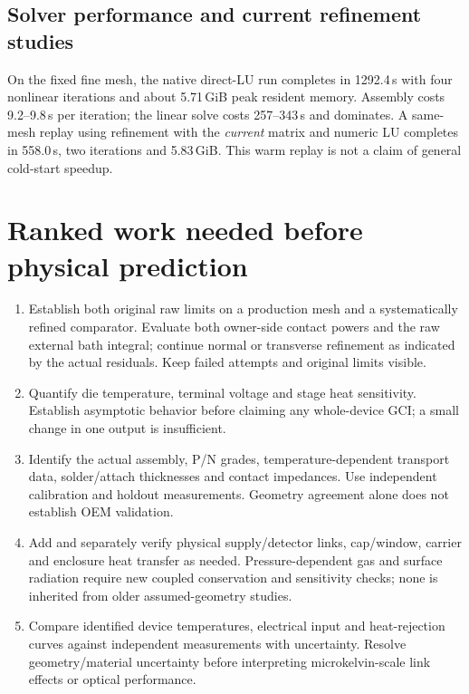 \documentclass[11pt,a4paper]{article}
\begin{document}
\subsection{Solver performance and current refinement studies}
On the fixed fine mesh, the native direct-LU run completes in 1292.4\,s with four nonlinear iterations and about 5.71\,GiB peak resident memory. Assembly costs 9.2--9.8\,s per iteration; the linear solve costs 257--343\,s and dominates. A same-mesh replay using refinement with the \emph{current} matrix and numeric LU completes in 558.0\,s, two iterations and 5.83\,GiB. This warm replay is not a claim of general cold-start speedup.


\clearpage
\section{Ranked work needed before physical prediction}
\begin{enumerate}
\item Establish both original raw limits on a production mesh and a systematically refined comparator. Evaluate both owner-side contact powers and the raw external bath integral; continue normal or transverse refinement as indicated by the actual residuals. Keep failed attempts and original limits visible.
\item Quantify die temperature, terminal voltage and stage heat sensitivity. Establish asymptotic behavior before claiming any whole-device GCI; a small change in one output is insufficient.
\item Identify the actual assembly, P/N grades, temperature-dependent transport data, solder/attach thicknesses and contact impedances. Use independent calibration and holdout measurements. Geometry agreement alone does not establish OEM validation.
\item Add and separately verify physical supply/detector links, cap/window, carrier and enclosure heat transfer as needed. Pressure-dependent gas and surface radiation require new coupled conservation and sensitivity checks; none is inherited from older assumed-geometry studies.
\item Compare identified device temperatures, electrical input and heat-rejection curves against independent measurements with uncertainty. Resolve geometry/material uncertainty before interpreting microkelvin-scale link effects or optical performance.
\end{enumerate}
\end{document}
